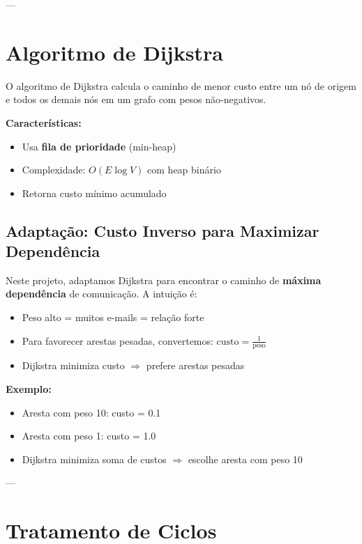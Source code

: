 \documentclass[12pt,openright,twoside,a4paper,english,brazilian,hidelinks]{abntex2}
\begin{document}
    ---

    \section{Algoritmo de Dijkstra}

    O algoritmo de Dijkstra calcula o caminho de menor custo entre um nó de origem e todos
    os demais nós em um grafo com pesos não-negativos.

    \textbf{Características:}
    \begin{itemize}
        \item Usa \textbf{fila de prioridade} (min-heap)
        \item Complexidade: $O(E \log V)$ com heap binário
        \item Retorna custo mínimo acumulado
    \end{itemize}

    \subsection{Adaptação: Custo Inverso para Maximizar Dependência}

    Neste projeto, adaptamos Dijkstra para encontrar o caminho de \textbf{máxima dependência}
    de comunicação. A intuição é:

    \begin{itemize}
        \item Peso alto = muitos e-mails = relação forte
        \item Para favorecer arestas pesadas, convertemos: $\text{custo} = \frac{1}{\text{peso}}$
        \item Dijkstra minimiza custo $\Rightarrow$ prefere arestas pesadas
    \end{itemize}

    \textbf{Exemplo:}
    \begin{itemize}
        \item Aresta com peso 10: custo = 0.1
        \item Aresta com peso 1: custo = 1.0
        \item Dijkstra minimiza soma de custos $\Rightarrow$ escolhe aresta com peso 10
    \end{itemize}

    ---

    \section{Tratamento de Ciclos}
\end{document}
